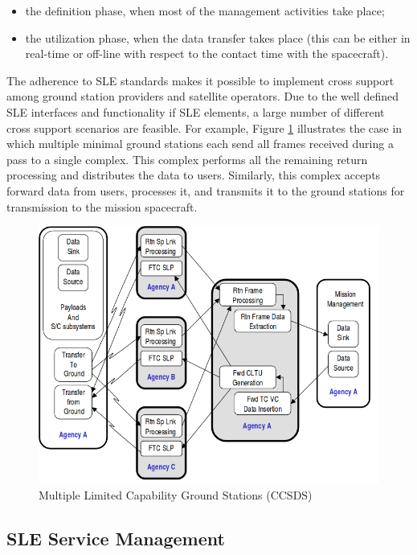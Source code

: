 \begin{itemize}
\item the definition phase, when most of the management activities take place;
\item the utilization phase, when the data transfer takes place (this can be either in real-time or off-line with respect to the contact time with the spacecraft).
\end{itemize}

The adherence to SLE standards makes it possible to implement cross support among ground station providers and satellite operators. Due to the well defined SLE interfaces and functionality if SLE elements, a large number of different cross support scenarios are feasible. For example, Figure \ref{fig:Multiple Limited Capability Ground Stations} illustrates the case in which multiple minimal ground stations each send all frames received during a pass to a single complex. This complex performs all the remaining return processing and distributes the data to users. Similarly, this complex accepts forward data from users, processes it, and transmits it to the ground stations for transmission to the mission spacecraft.

\begin{figure}[h]
\centering\includegraphics[scale=0.5]{fig/multiple_limited_capability_ground_stations}
\caption{Multiple Limited Capability Ground Stations (CCSDS)}
\label{fig:Multiple Limited Capability Ground Stations}
\end{figure}

\subsection{SLE Service Management}

